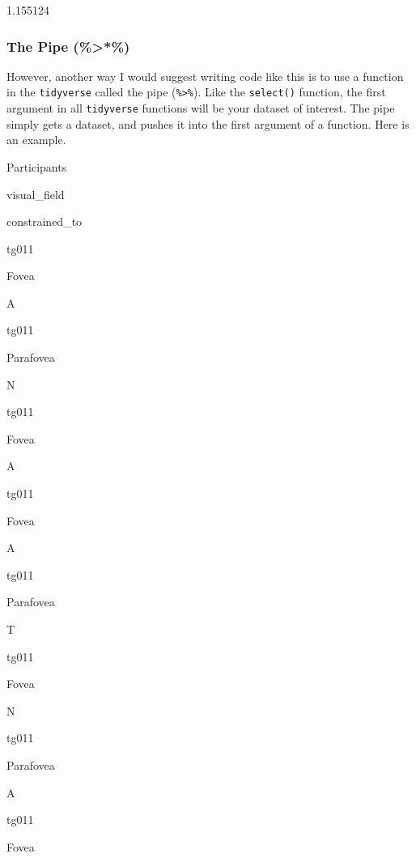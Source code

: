 \documentclass[]{book}
\newenvironment{Shaded}{\begin{snugshade}}{\end{snugshade}}
\newcommand{\KeywordTok}[1]{\textcolor[rgb]{0.13,0.29,0.53}{\textbf{#1}}}
\newcommand{\StringTok}[1]{\textcolor[rgb]{0.31,0.60,0.02}{#1}}
\newcommand{\OperatorTok}[1]{\textcolor[rgb]{0.81,0.36,0.00}{\textbf{#1}}}
\newcommand{\NormalTok}[1]{#1}
\begin{document}
1.155124

\subsubsection{The Pipe (\%\textgreater{}*\%)}\label{the-pipe}

However, another way I would suggest writing code like this is to use a
function in the \texttt{tidyverse} called the pipe
(\texttt{\%\textgreater{}\%}). Like the \texttt{select()} function, the
first argument in all \texttt{tidyverse} functions will be your dataset
of interest. The pipe simply gets a dataset, and pushes it into the
first argument of a function. Here is an example.

\begin{Shaded}
\end{Shaded}

Participants

visual\_field

constrained\_to

tg011

Fovea

A

tg011

Parafovea

N

tg011

Fovea

A

tg011

Fovea

A

tg011

Parafovea

T

tg011

Fovea

N

tg011

Parafovea

A

tg011

Fovea
\end{document}
